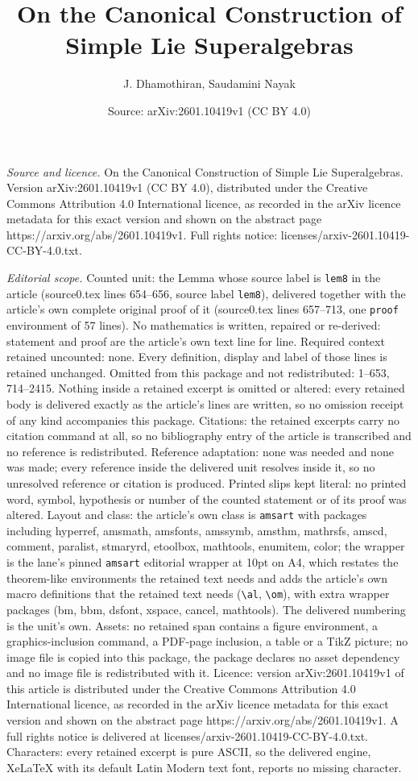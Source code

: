 \documentclass[10pt,a4paper]{amsart}
\title[On the Canonical Construction of Simple Lie Superalgebras]{On the Canonical Construction of Simple Lie Superalgebras}
\author{J. Dhamothiran, Saudamini Nayak}
\date{Source: arXiv:2601.10419v1 (CC BY 4.0)}
\begin{document}
\maketitle

\noindent\emph{Source and licence.} On the Canonical Construction of Simple Lie Superalgebras. Version arXiv:2601.10419v1 (CC BY 4.0), distributed under the Creative Commons Attribution 4.0 International licence, as recorded in the arXiv licence metadata for this exact version and shown on the abstract page https://arxiv.org/abs/2601.10419v1. Full rights notice: licenses/arxiv-2601.10419-CC-BY-4.0.txt.\par\smallskip

\noindent\textit{Editorial scope.} Counted unit: the Lemma whose source label is \texttt{lem8} in the article (source0.tex lines 654--656, source label \texttt{lem8}), delivered together with the article's own complete original proof of it (source0.tex lines 657--713, one \texttt{proof} environment of 57 lines). No mathematics is written, repaired or re-derived: statement and proof are the article's own text line for line. Required context retained uncounted: none. Every definition, display and label of those lines is retained unchanged. Omitted from this package and not redistributed: 1--653, 714--2415. Nothing inside a retained excerpt is omitted or altered: every retained body is delivered exactly as the article's lines are written, so no omission receipt of any kind accompanies this package. Citations: the retained excerpts carry no citation command at all, so no bibliography entry of the article is transcribed and no reference is redistributed. Reference adaptation: none was needed and none was made; every reference inside the delivered unit resolves inside it, so no unresolved reference or citation is produced. Printed slips kept literal: no printed word, symbol, hypothesis or number of the counted statement or of its proof was altered. Layout and class: the article's own class is \texttt{amsart} with packages including hyperref, amsmath, amsfonts, amssymb, amsthm, mathrsfs, amscd, comment, paralist, stmaryrd, etoolbox, mathtools, enumitem, color; the wrapper is the lane's pinned \texttt{amsart} editorial wrapper at 10pt on A4, which restates the theorem-like environments the retained text needs and adds the article's own macro definitions that the retained text needs (\texttt{\textbackslash al}, \texttt{\textbackslash om}), with extra wrapper packages (bm, bbm, dsfont, xspace, cancel, mathtools). The delivered numbering is the unit's own. Assets: no retained span contains a figure environment, a graphics-inclusion command, a PDF-page inclusion, a table or a TikZ picture; no image file is copied into this package, the package declares no asset dependency and no image file is redistributed with it. Licence: version arXiv:2601.10419v1 of this article is distributed under the Creative Commons Attribution 4.0 International licence, as recorded in the arXiv licence metadata for this exact version and shown on the abstract page https://arxiv.org/abs/2601.10419v1. A full rights notice is delivered at licenses/arxiv-2601.10419-CC-BY-4.0.txt. Characters: every retained excerpt is pure ASCII, so the delivered engine, XeLaTeX with its default Latin Modern text font, reports no missing character.
\end{document}
